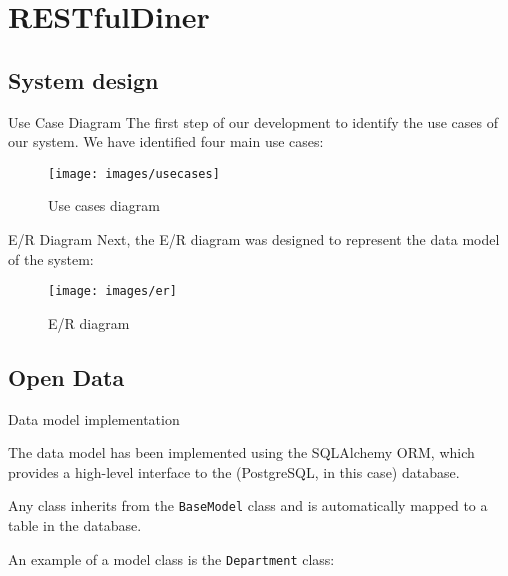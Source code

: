 

\section[RESTfulDiner]{RESTfulDiner}

\subsection[System design]{System design}

\begin{frame}{Use Case Diagram}
	The first step of our development to identify the use cases of our system.
	We have identified four main use cases:

	\begin{figure}[h!]
		\centering
		\texttt{[image: images/usecases]}
		\caption{Use cases diagram}
		\label{fig:usecases}
	\end{figure}

\end{frame}

\begin{frame}{E/R Diagram}
	Next, the E/R diagram was designed to represent the data model of the
	system:

	\begin{figure}[h!]
		\centering
		\texttt{[image: images/er]}
		\caption{E/R diagram}
		\label{fig:er}
	\end{figure}

\end{frame}

\subsection[Open Data]{Open Data}

\begin{frame}[allowframebreaks]{Data model implementation}

	The data model has been implemented using the SQLAlchemy ORM, which
	provides a high-level interface to the (PostgreSQL, in this case) database.

	

	Any class inherits from the \texttt{BaseModel} class and is automatically
	mapped to a table in the database.

	\framebreak

	An example of a model class is the \texttt{Department} class:

	
	\vspace*{-.25\baselineskip}
\end{frame}

